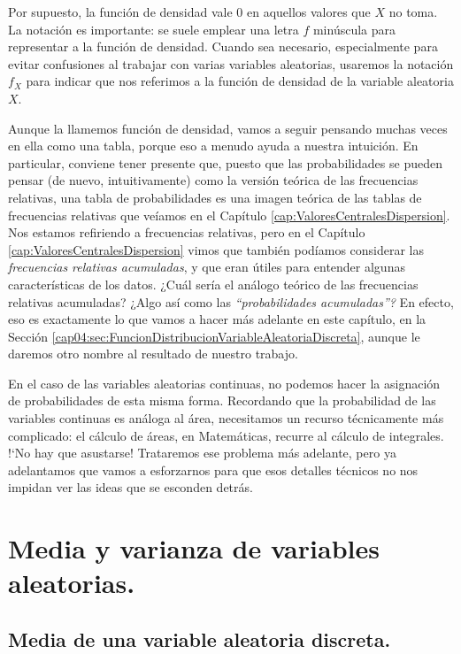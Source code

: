 Por supuesto, la función de densidad vale 0 en aquellos valores que $X$ no toma. La notación es importante: se suele emplear una letra $f$ minúscula para representar a la función de densidad. Cuando sea necesario, especialmente para evitar confusiones al trabajar con varias variables aleatorias, usaremos la notación $f_X$ para indicar que nos referimos a la función de densidad de la variable aleatoria $X$.

Aunque la llamemos función de densidad, vamos a seguir pensando muchas veces en ella como una tabla, porque eso a menudo ayuda a nuestra intuición. En particular, conviene tener presente que, puesto que las probabilidades se pueden pensar (de nuevo, intuitivamente) como la versión teórica de las frecuencias relativas, una tabla de probabilidades es una imagen teórica de las tablas de frecuencias relativas que veíamos en el Capítulo \ref{cap:ValoresCentralesDispersion}. Nos estamos refiriendo a frecuencias relativas, pero en el Capítulo \ref{cap:ValoresCentralesDispersion} vimos que también podíamos considerar las {\em frecuencias relativas acumuladas}, y que eran útiles para entender algunas características de los datos. ¿Cuál sería el análogo teórico de las frecuencias relativas acumuladas? ¿Algo así como las {\em ``probabilidades acumuladas''?} En efecto, eso es exactamente lo que vamos a hacer más adelante en este capítulo, en la Sección \ref{cap04:sec:FuncionDistribucionVariableAleatoriaDiscreta}, aunque le daremos otro nombre al resultado de nuestro trabajo.

En el caso de las variables aleatorias continuas, no podemos hacer la asignación de probabilidades de esta misma forma. Recordando que la probabilidad de las variables continuas es análoga al área, necesitamos un recurso técnicamente más complicado: el cálculo de áreas, en Matemáticas, recurre al cálculo de integrales. {!`}No hay que asustarse! Trataremos ese problema más adelante, pero ya  adelantamos que vamos a esforzarnos para que esos detalles técnicos no nos impidan ver las ideas que se esconden detrás.


\section{Media y varianza de variables aleatorias.}\label{cap04:sec:MediaVarianzaVariablesAleatorias}


\subsection{Media de una variable aleatoria discreta.}
\label{cap04:subsec:MediaVariableAleatroriaDiscreta}

